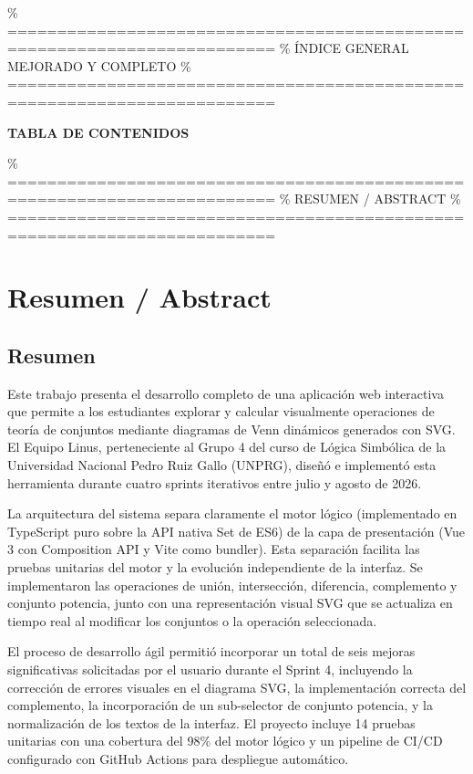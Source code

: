 \documentclass[11pt,a4paper]{article}
\begin{document}
\% =========================================================================
\% ÍNDICE GENERAL MEJORADO Y COMPLETO
\% =========================================================================
\thispagestyle{plain}
\begin{tcolorbox}[colback=bannerblue,coltext=white,sharp corners,boxrule=0pt,halign=center,top=6pt,bottom=6pt]
    \large\bfseries TABLA DE CONTENIDOS
\end{tcolorbox}
\vspace{0.3cm}

\tableofcontents
\newpage

\% =========================================================================
\% RESUMEN / ABSTRACT
\% =========================================================================
\section*{Resumen / Abstract}

\subsection*{Resumen}
Este trabajo presenta el desarrollo completo de una aplicación web interactiva que permite a los estudiantes explorar y calcular visualmente operaciones de teoría de conjuntos mediante diagramas de Venn dinámicos generados con SVG. El Equipo Linus, perteneciente al Grupo 4 del curso de Lógica Simbólica de la Universidad Nacional Pedro Ruiz Gallo (UNPRG), diseñó e implementó esta herramienta durante cuatro sprints iterativos entre julio y agosto de 2026.

La arquitectura del sistema separa claramente el motor lógico (implementado en TypeScript puro sobre la API nativa Set de ES6) de la capa de presentación (Vue 3 con Composition API y Vite como bundler). Esta separación facilita las pruebas unitarias del motor y la evolución independiente de la interfaz. Se implementaron las operaciones de unión, intersección, diferencia, complemento y conjunto potencia, junto con una representación visual SVG que se actualiza en tiempo real al modificar los conjuntos o la operación seleccionada.

El proceso de desarrollo ágil permitió incorporar un total de seis mejoras significativas solicitadas por el usuario durante el Sprint 4, incluyendo la corrección de errores visuales en el diagrama SVG, la implementación correcta del complemento, la incorporación de un sub-selector de conjunto potencia, y la normalización de los textos de la interfaz. El proyecto incluye 14 pruebas unitarias con una cobertura del 98\% del motor lógico y un pipeline de CI/CD configurado con GitHub Actions para despliegue automático.
\end{document}
